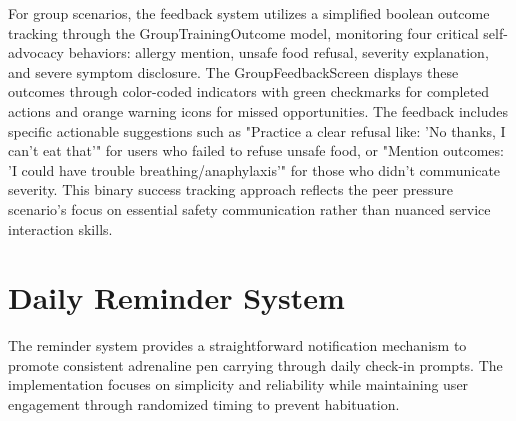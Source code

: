 \documentclass[MScCS]{uccthesis}
\begin{document}
For group scenarios, the feedback system utilizes a simplified boolean outcome tracking through the GroupTrainingOutcome model, monitoring four critical self-advocacy behaviors: allergy mention, unsafe food refusal, severity explanation, and severe symptom disclosure. The GroupFeedbackScreen displays these outcomes through color-coded indicators with green checkmarks for completed actions and orange warning icons for missed opportunities. The feedback includes specific actionable suggestions such as "Practice a clear refusal like: 'No thanks, I can't eat that'" for users who failed to refuse unsafe food, or "Mention outcomes: 'I could have trouble breathing/anaphylaxis'" for those who didn't communicate severity. This binary success tracking approach reflects the peer pressure scenario's focus on essential safety communication rather than nuanced service interaction skills.


\section{Daily Reminder System}

The reminder system provides a straightforward notification mechanism to promote consistent adrenaline pen carrying through daily check-in prompts. The implementation focuses on simplicity and reliability while maintaining user engagement through randomized timing to prevent habituation.
\end{document}
